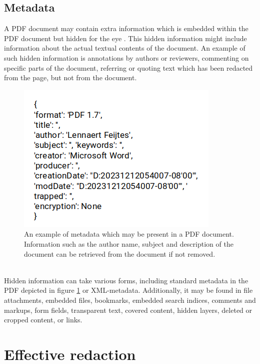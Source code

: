 \subsection{Metadata}
A PDF document may contain extra information which is embedded within the PDF document but hidden for the eye \cite{muller2021processing}. This hidden information might include information about the actual textual contents of the document. An example of such hidden information is annotations by authors or reviewers, commenting on specific parts of the document, referring or quoting text which has been redacted from the page, but not from the document. 
\begin{figure}[h]
    \includegraphics[width=0.5\linewidth]{latex/media/metadata.png}
    \centering
    \caption{An example of metadata which may be present in a PDF document. Information such as the author name, subject and description of the document can be retrieved from the document if not removed.}
    \label{fig:metadataexmp}
\end{figure}\\
Hidden information can take various forms, including standard metadata in the PDF depicted in figure \ref{fig:metadataexmp} or XML-metadata. Additionally, it may be found in file attachments, embedded files, bookmarks, embedded search indices, comments and markups, form fields, transparent text, covered content, hidden layers, deleted or cropped content, or links.
\section{Effective redaction}

